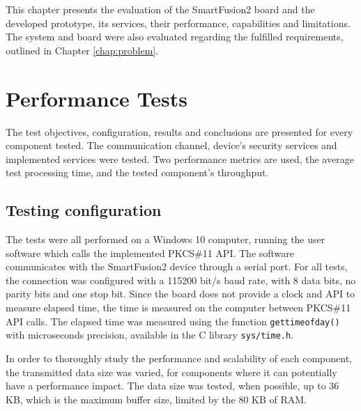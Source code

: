\cleardoublepage
\label{chap:evaluation}

This chapter presents the evaluation of the SmartFusion2 board and the developed prototype, its services, their performance, capabilities and limitations. The system and board were also evaluated regarding the fulfilled requirements, outlined in Chapter \ref{chap:problem}.

\section{Performance Tests}\label{chap:evaluation:performance}

The test objectives, configuration, results and conclusions are presented for every component tested.
The communication channel, device's security services and implemented services were tested.
Two performance metrics are used, the average test processing time, and the tested component's throughput.

\subsection{Testing configuration}\label{chap:evaluation:performance:config}

The tests were all performed on a Windows 10 computer, running the user software which calls the implemented PKCS\#11 API. The software communicates with the SmartFusion2 device through a serial port. For all tests, the connection was configured with a 115200 bit/s baud rate, with 8 data bits, no parity bits and one stop bit.
Since the board does not provide a clock and API to measure elapsed time, the time is measured on the computer between PKCS\#11 API calls.
The elapsed time was measured using the function \texttt{gettimeofday()} with microseconds precision, available in the C library \texttt{sys/time.h}.

In order to thoroughly study the performance and scalability of each component, the transmitted data size was varied, for components where it can potentially have a performance impact. The data size was tested, when possible, up to 36 KB, which is the maximum buffer size, limited by the 80 KB of RAM.

